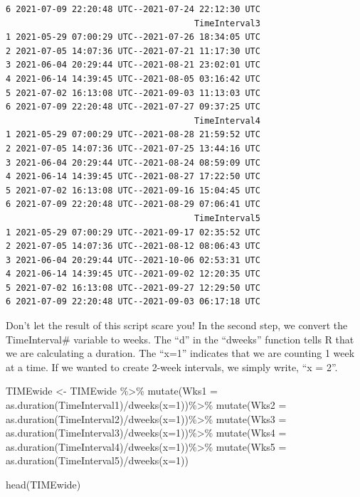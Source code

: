 \documentclass[
  english,
]{book}
\newenvironment{Shaded}{\begin{snugshade}}{\end{snugshade}}
\newcommand{\AttributeTok}[1]{\textcolor[rgb]{0.77,0.63,0.00}{#1}}
\newcommand{\DecValTok}[1]{\textcolor[rgb]{0.00,0.00,0.81}{#1}}
\newcommand{\FunctionTok}[1]{\textcolor[rgb]{0.00,0.00,0.00}{#1}}
\newcommand{\NormalTok}[1]{#1}
\newcommand{\OtherTok}[1]{\textcolor[rgb]{0.56,0.35,0.01}{#1}}
\newcommand{\SpecialCharTok}[1]{\textcolor[rgb]{0.00,0.00,0.00}{#1}}
\begin{document}
\begin{verbatim}
6 2021-07-09 22:20:48 UTC--2021-07-24 22:12:30 UTC
                                     TimeInterval3
1 2021-05-29 07:00:29 UTC--2021-07-26 18:34:05 UTC
2 2021-07-05 14:07:36 UTC--2021-07-21 11:17:30 UTC
3 2021-06-04 20:29:44 UTC--2021-08-21 23:02:01 UTC
4 2021-06-14 14:39:45 UTC--2021-08-05 03:16:42 UTC
5 2021-07-02 16:13:08 UTC--2021-09-03 11:13:03 UTC
6 2021-07-09 22:20:48 UTC--2021-07-27 09:37:25 UTC
                                     TimeInterval4
1 2021-05-29 07:00:29 UTC--2021-08-28 21:59:52 UTC
2 2021-07-05 14:07:36 UTC--2021-07-25 13:44:16 UTC
3 2021-06-04 20:29:44 UTC--2021-08-24 08:59:09 UTC
4 2021-06-14 14:39:45 UTC--2021-08-27 17:22:50 UTC
5 2021-07-02 16:13:08 UTC--2021-09-16 15:04:45 UTC
6 2021-07-09 22:20:48 UTC--2021-08-29 07:06:41 UTC
                                     TimeInterval5
1 2021-05-29 07:00:29 UTC--2021-09-17 02:35:52 UTC
2 2021-07-05 14:07:36 UTC--2021-08-12 08:06:43 UTC
3 2021-06-04 20:29:44 UTC--2021-10-06 02:53:31 UTC
4 2021-06-14 14:39:45 UTC--2021-09-02 12:20:35 UTC
5 2021-07-02 16:13:08 UTC--2021-09-27 12:29:50 UTC
6 2021-07-09 22:20:48 UTC--2021-09-03 06:17:18 UTC
\end{verbatim}

Don't let the result of this script scare you! In the second step, we convert the TimeInterval\# variable to weeks. The ``d'' in the ``dweeks'' function tells R that we are calculating a duration. The ``x=1'' indicates that we are counting 1 week at a time. If we wanted to create 2-week intervals, we simply write, ``x = 2''.

\begin{Shaded}
\begin{Highlighting}[]
\NormalTok{TIMEwide }\OtherTok{\textless{}{-}}\NormalTok{ TIMEwide }\SpecialCharTok{\%\textgreater{}\%}
  \FunctionTok{mutate}\NormalTok{(}\AttributeTok{Wks1 =} \FunctionTok{as.duration}\NormalTok{(TimeInterval1)}\SpecialCharTok{/}\FunctionTok{dweeks}\NormalTok{(}\AttributeTok{x=}\DecValTok{1}\NormalTok{))}\SpecialCharTok{\%\textgreater{}\%}
  \FunctionTok{mutate}\NormalTok{(}\AttributeTok{Wks2 =} \FunctionTok{as.duration}\NormalTok{(TimeInterval2)}\SpecialCharTok{/}\FunctionTok{dweeks}\NormalTok{(}\AttributeTok{x=}\DecValTok{1}\NormalTok{))}\SpecialCharTok{\%\textgreater{}\%}
  \FunctionTok{mutate}\NormalTok{(}\AttributeTok{Wks3 =} \FunctionTok{as.duration}\NormalTok{(TimeInterval3)}\SpecialCharTok{/}\FunctionTok{dweeks}\NormalTok{(}\AttributeTok{x=}\DecValTok{1}\NormalTok{))}\SpecialCharTok{\%\textgreater{}\%}
  \FunctionTok{mutate}\NormalTok{(}\AttributeTok{Wks4 =} \FunctionTok{as.duration}\NormalTok{(TimeInterval4)}\SpecialCharTok{/}\FunctionTok{dweeks}\NormalTok{(}\AttributeTok{x=}\DecValTok{1}\NormalTok{))}\SpecialCharTok{\%\textgreater{}\%}
  \FunctionTok{mutate}\NormalTok{(}\AttributeTok{Wks5 =} \FunctionTok{as.duration}\NormalTok{(TimeInterval5)}\SpecialCharTok{/}\FunctionTok{dweeks}\NormalTok{(}\AttributeTok{x=}\DecValTok{1}\NormalTok{))}

\FunctionTok{head}\NormalTok{(TIMEwide)}
\end{Highlighting}
\end{Shaded}
\end{document}
